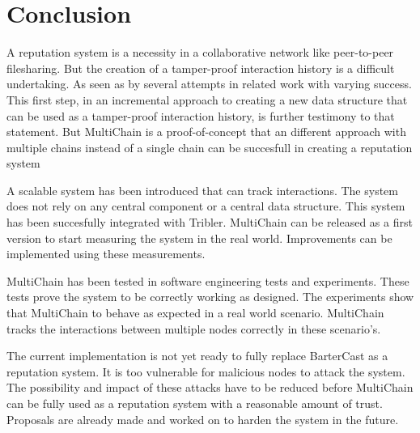 \chapter{Conclusion}
A reputation system is a necessity in a collaborative network like peer-to-peer filesharing.
But the creation of a tamper-proof interaction history is a difficult undertaking.
As seen as by several attempts in related work with varying success.
This first step, in an incremental approach to creating a new data structure
that can be used as a tamper-proof interaction history, is further testimony to that statement.
But MultiChain is a proof-of-concept that an different approach with multiple chains
instead of a single chain can be succesfull in creating a reputation system

A scalable system has been introduced that can track interactions.
The system does not rely on any central component or a central data structure.
This system has been succesfully integrated with Tribler.
MultiChain can be released as a first version to start measuring the system in the real world.
Improvements can be implemented using these measurements.

MultiChain has been tested in software engineering tests and experiments.
These tests prove the system to be correctly working as designed.
The experiments show that MultiChain to behave as expected in a real world scenario.
MultiChain tracks the interactions between multiple nodes correctly in these scenario's.

The current implementation is not yet ready to fully replace BarterCast as a reputation system.
It is too vulnerable for malicious nodes to attack the system.
The possibility and impact of these attacks have to be reduced
before MultiChain can be fully used as a reputation system with a reasonable amount of trust.
Proposals are already made and worked on to harden the system in the future.


